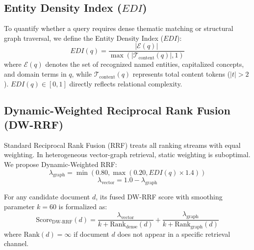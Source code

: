 \documentclass[conference]{IEEEtran}
\begin{document}
\subsection{Entity Density Index ($EDI$)}
To quantify whether a query requires dense thematic matching or structural graph traversal, we define the Entity Density Index ($EDI$):
\begin{equation}
EDI(q) = \frac{|\mathcal{E}(q)|}{\max(|\mathcal{T}_{\text{content}}(q)|, 1)}
\end{equation}
where $\mathcal{E}(q)$ denotes the set of recognized named entities, capitalized concepts, and domain terms in $q$, while $\mathcal{T}_{\text{content}}(q)$ represents total content tokens ($|t| > 2$). $EDI(q) \in [0, 1]$ directly reflects relational complexity.

\subsection{Dynamic-Weighted Reciprocal Rank Fusion (DW-RRF)}
Standard Reciprocal Rank Fusion (RRF) \cite{cormack2009reciprocal} treats all ranking streams with equal weighting. In heterogeneous vector-graph retrieval, static weighting is suboptimal. We propose Dynamic-Weighted RRF:
\begin{equation}
\lambda_{\text{graph}} = \min\left(0.80, \max\left(0.20, EDI(q) \times 1.4\right)\right)
\end{equation}
\begin{equation}
\lambda_{\text{vector}} = 1.0 - \lambda_{\text{graph}}
\end{equation}

For any candidate document $d$, its fused DW-RRF score with smoothing parameter $k = 60$ is formalized as:
\begin{equation}
\text{Score}_{\text{DW-RRF}}(d) = \frac{\lambda_{\text{vector}}}{k + \text{Rank}_{\text{dense}}(d)} + \frac{\lambda_{\text{graph}}}{k + \text{Rank}_{\text{graph}}(d)}
\end{equation}
where $\text{Rank}(d) = \infty$ if document $d$ does not appear in a specific retrieval channel.
\end{document}
